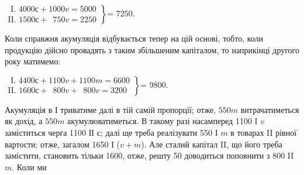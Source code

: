 \begin{center}
$
 \left.\begin{aligned}
        \text{ I. }4000 с + 1000 v = 5000\\
        \text{II. }1500 с + \phantom{0}750 v = 2250
       \end{aligned}
 \right\}
 \text{= 7250.}
$
\end{center}

Коли справжня акумуляція відбувається тепер на цій основі, тобто,
коли продукцію дійсно провадять з таким збільшеним капіталом, то
наприкінці другого року матимемо:

\begin{center}
$
 \left.\begin{aligned}
        \text{ I. }4400 с + 1100 v + 1100 m= 6600\\
        \text{II. }1600 с + \phantom{0}800 v + \phantom{0}800 v = 3200
       \end{aligned}
 \right\}
 \text{= 9800.}
$
\end{center}

Акумуляція в І триватиме далі в тій самій пропорції; отже, $550 m$
витрачатиметься як дохід, а $550 m$ акумулюватиметься. В такому разі насамперед
1100 I $v$ заміститься черга 1100 ІІ $с$; далі ще треба реалізувати
550 I $m$ в товарах II рівної вартости; отже, загалом 1650 І
($v + m$). Але сталий капітал II, що його треба замістити, становить
тільки 1600, отже, решту 50 доводиться поповнити з 800 II $m$. Коли ми
\parbreak{}  %
